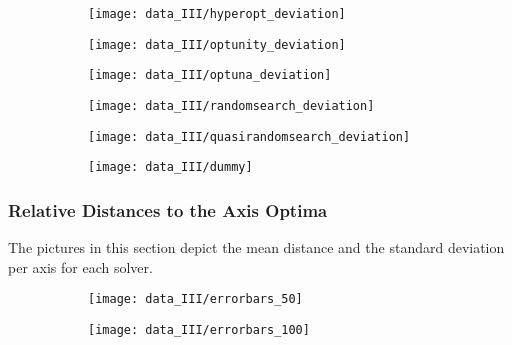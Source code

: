\begin{figure}[h]
	\begin{subfigure}{0.5\textwidth}
		\texttt{[image: data\_III/hyperopt\_deviation]}
		\label{fig:hyperopt_deviation_III}
	\end{subfigure}
	\begin{subfigure}{0.5\textwidth}
		\texttt{[image: data\_III/optunity\_deviation]}
		\label{fig:optunity_deviation_III}
	\end{subfigure}
\end{figure}

\begin{figure}[h]
	\begin{subfigure}{0.5\textwidth}
		\texttt{[image: data\_III/optuna\_deviation]} 
		\label{fig:optuna_deviation_III}
	\end{subfigure}
	\begin{subfigure}{0.5\textwidth}
		\texttt{[image: data\_III/randomsearch\_deviation]}
		\label{fig:randomsearch_deviation_III}
	\end{subfigure}
\end{figure}

\begin{figure}[h]
	\begin{subfigure}{0.5\textwidth}
		\texttt{[image: data\_III/quasirandomsearch\_deviation]} 
		\label{fig:quasirandomsearch_deviation_III}
	\end{subfigure}
	\begin{subfigure}{0.5\textwidth}
		\texttt{[image: data\_III/dummy]}
		\label{fig:dummy2_III}
	\end{subfigure}
\end{figure}


\newpage


\subsubsection{Relative Distances to the Axis Optima}

The pictures in this section depict the mean distance and the standard deviation per axis for each solver.

\begin{figure}[h]
	\begin{subfigure}{0.5\textwidth}
		\texttt{[image: data\_III/errorbars\_50]}
		\label{fig:errorbars_50_III}
	\end{subfigure}
	\begin{subfigure}{0.5\textwidth}
		\texttt{[image: data\_III/errorbars\_100]}
		\label{fig:errorbars_100_III}
	\end{subfigure}
\end{figure}

